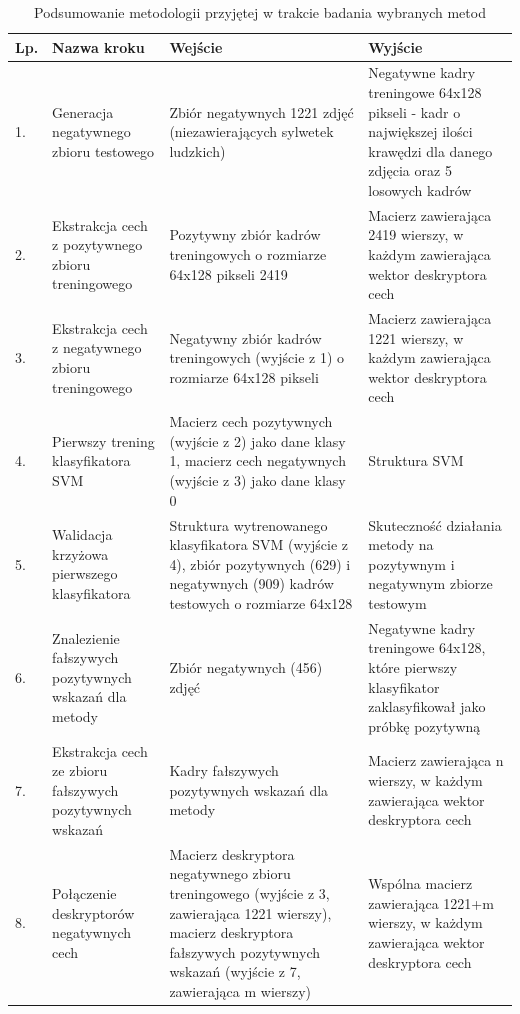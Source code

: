 \begin{center}
    \begin{longtable}{ | l | p{4cm} | p{5cm} | p{5cm} |}
    \caption{Podsumowanie metodologii przyjętej w trakcie badania wybranych metod}
    \label{tab:metodologia}\\
    \hline
    Lp. & Nazwa kroku & Wejście & Wyjście \\ \hline
    1. & Generacja negatywnego zbioru testowego & Zbiór
negatywnych 1221 zdjęć (niezawierających sylwetek ludzkich) & Negatywne kadry treningowe 64x128 pikseli - kadr o największej ilości krawędzi
dla danego zdjęcia oraz 5 losowych kadrów \\ \hline

	2. & Ekstrakcja cech z pozytywnego zbioru treningowego &
	Pozytywny zbiór
kadrów treningowych o rozmiarze 64x128 pikseli 2419 &
	 Macierz
zawierająca 2419 wierszy, w każdym zawierająca wektor deskryptora cech \\ \hline

3. & Ekstrakcja cech z negatywnego zbioru treningowego &
   Negatywny zbiór
kadrów treningowych (wyjście z 1) o rozmiarze 64x128 pikseli &
Macierz
zawierająca 1221 wierszy, w każdym zawierająca wektor deskryptora cech \\ \hline

4. & Pierwszy trening klasyfikatora SVM &
Macierz cech pozytywnych (wyjście z 2) jako dane klasy 1, macierz cech
negatywnych (wyjście z 3) jako dane klasy 0 & Struktura SVM \\ \hline

5. & Walidacja krzyżowa pierwszego klasyfikatora & Struktura
wytrenowanego klasyfikatora SVM (wyjście z 4), zbiór pozytywnych (629) i
negatywnych (909)  kadrów testowych o rozmiarze 64x128 &
Skuteczność działania metody na pozytywnym i negatywnym zbiorze
testowym \\ \hline

6. & Znalezienie fałszywych pozytywnych wskazań dla metody & Zbiór
negatywnych (456) zdjęć & Negatywne kadry treningowe 64x128,
które pierwszy klasyfikator zaklasyfikował jako próbkę pozytywną\\ \hline

7. & Ekstrakcja cech ze zbioru fałszywych pozytywnych wskazań & Kadry
fałszywych pozytywnych wskazań dla metody & Macierz zawierająca n
wierszy, w każdym zawierająca wektor deskryptora cech\\ \hline

8. & Połączenie deskryptorów negatywnych cech & Macierz deskryptora
negatywnego zbioru treningowego (wyjście z 3, zawierająca 1221 wierszy),
macierz deskryptora fałszywych pozytywnych wskazań (wyjście z 7,
zawierająca m wierszy) & Wspólna macierz zawierająca 1221+m wierszy, w
każdym zawierająca wektor deskryptora cech \\ \hline


\end{longtable}
\end{center}
